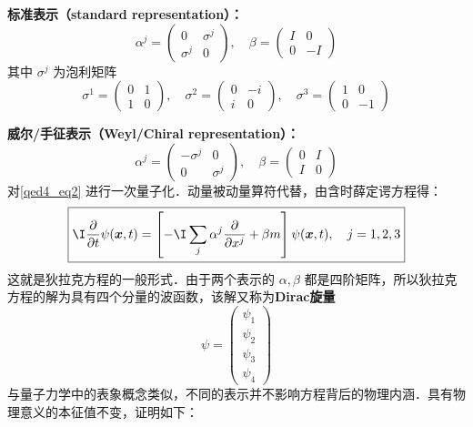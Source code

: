 \textbf{标准表示（standard representation）：}
\begin{equation}\label{qed4_eq6}
\alpha^{j}=\left(\begin{array}{cc}
0 & \sigma^{j} \\
\sigma^{j} & 0
\end{array}\right), \quad \beta=\left(\begin{array}{rr}
I & 0 \\
0 & -I
\end{array}\right)
\end{equation}
其中 $\sigma^{j}$ 为泡利矩阵
\begin{equation}\label{qed4_eq7}
\sigma^{1}=\left(\begin{array}{ll}
0 & 1 \\
1 & 0
\end{array}\right), \quad \sigma^{2}=\left(\begin{array}{rr}
0 & -i \\
i & 0
\end{array}\right), \quad \sigma^{3}=\left(\begin{array}{rr}
1 & 0 \\
0 & -1
\end{array}\right)
\end{equation}

\textbf{威尔/手征表示（Weyl/Chiral representation）：}
\begin{equation}\label{qed4_eq8}
\alpha^{j}=\left(\begin{array}{cc}
-\sigma^{j} & 0 \\
0 & \sigma^{j}
\end{array}\right), \quad \beta=\left(\begin{array}{cc}
0 & I \\
I & 0
\end{array}\right)
\end{equation}
对\autoref{qed4_eq2} 进行一次量子化．动量被动量算符代替，由含时薛定谔方程得：\begin{equation}\label{qed4_eq9}
\boxed{ \I \frac{\partial}{\partial t} \psi(\boldsymbol{x}, t)=\left[- \I \sum_{j} \alpha^{j} \frac{\partial}{\partial x^{j}}+\beta m\right] \psi(\boldsymbol{x}, t), \quad j=1,2,3}
\end{equation}
这就是狄拉克方程的一般形式．由于两个表示的 $\alpha,\beta$ 都是四阶矩阵，所以狄拉克方程的解为具有四个分量的波函数，该解又称为\textbf{Dirac旋量}
\begin{equation}\label{qed4_eq10}
\psi=\left(\begin{array}{l}
\psi_{1} \\
\psi_{2} \\
\psi_{3} \\
\psi_{4}
\end{array}\right)
\end{equation}
与量子力学中的表象概念类似，不同的表示并不影响方程背后的物理内涵．具有物理意义的本征值不变，证明如下：

